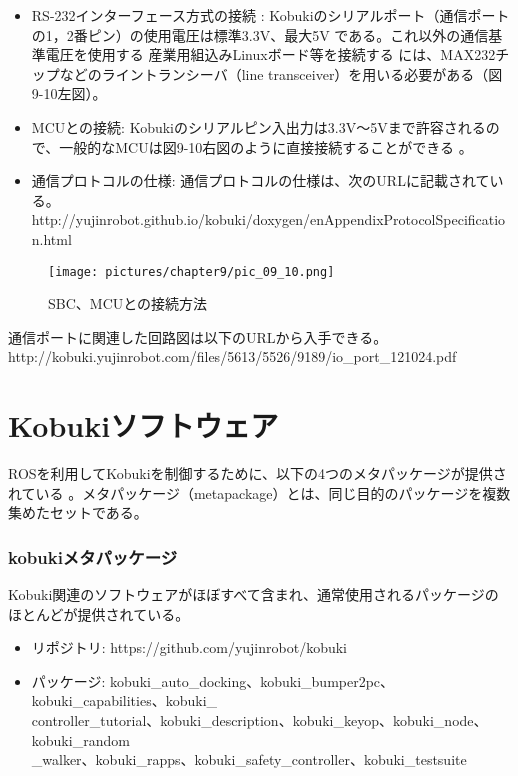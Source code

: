 \begin{itemize}
\item RS-232インターフェース方式の接続  : Kobukiのシリアルポート（通信ポートの1，2番ピン）の使用電圧は標準3.3V、最大5V   である。これ以外の通信基準電圧を使用する 産業用組込みLinuxボード等を接続する   には、MAX232チップなどのライントランシーバ（line transceiver）を用いる必要がある（図9-10左図）。
\item MCUとの接続: Kobukiのシリアルピン入出力は3.3V〜5Vまで許容されるので、一般的なMCUは図9-10右図のように直接接続することができる  。
\item 通信プロトコルの仕様: 通信プロトコルの仕様は、次のURLに記載されている。
\\http://yujinrobot.github.io/kobuki/doxygen/enAppendixProtocolSpecification.html
\end{itemize}

\begin{figure}[htp]
  \centering
  \texttt{[image: pictures/chapter9/pic\_09\_10.png]}
  \caption{SBC、MCUとの接続方法}
\end{figure}

\begin{exercise}[通信ポート関連回路図の入手先]
通信ポートに関連した回路図は以下のURLから入手できる。
\\http://kobuki.yujinrobot.com/files/5613/5526/9189/io\_port\_121024.pdf
\end{exercise}

\section{Kobukiソフトウェア}

ROSを利用してKobukiを制御するために、以下の4つのメタパッケージが提供されている  。メタパッケージ（metapackage）とは、同じ目的のパッケージを複数集めたセットである。

\subsubsection{kobukiメタパッケージ}

Kobuki関連のソフトウェアがほぼすべて含まれ、通常使用されるパッケージのほとんどが提供されている。

\begin{itemize}
\item リポジトリ: https://github.com/yujinrobot/kobuki
\item パッケージ: kobuki\_auto\_docking、kobuki\_bumper2pc、kobuki\_capabilities、kobuki\_\\controller\_tutorial、kobuki\_description、kobuki\_keyop、kobuki\_node、kobuki\_random\\\_walker、kobuki\_rapps、kobuki\_safety\_controller、kobuki\_testsuite
\end{itemize}

